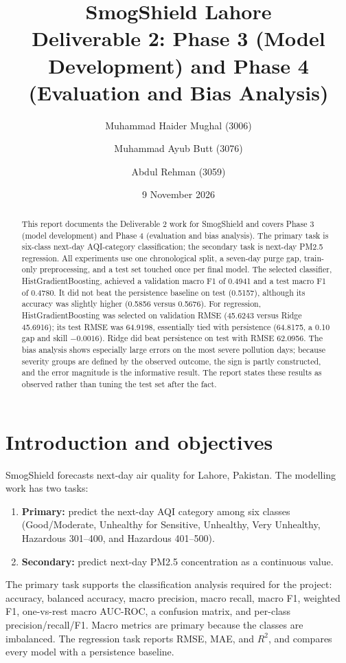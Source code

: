 \documentclass[11pt]{article}
\title{\textbf{SmogShield Lahore}\\[2mm]
Deliverable 2: Phase 3 (Model Development) and Phase 4 (Evaluation and Bias Analysis)}
\author{Muhammad Haider Mughal (3006) \and Muhammad Ayub Butt (3076) \and Abdul Rehman (3059)}
\date{9 November 2026}
\begin{document}
\maketitle

\begin{abstract}
This report documents the Deliverable 2 work for SmogShield and covers Phase 3 (model development) and Phase 4 (evaluation and bias analysis). The primary task is six-class next-day AQI-category classification; the secondary task is next-day PM2.5 regression. All experiments use one chronological split, a seven-day purge gap, train-only preprocessing, and a test set touched once per final model. The selected classifier, HistGradientBoosting, achieved a validation macro F1 of 0.4941 and a test macro F1 of 0.4780. It did not beat the persistence baseline on test (0.5157), although its accuracy was slightly higher (0.5856 versus 0.5676). For regression, HistGradientBoosting was selected on validation RMSE (45.6243 versus Ridge 45.6916); its test RMSE was 64.9198, essentially tied with persistence (64.8175, a 0.10 gap and skill $-0.0016$). Ridge did beat persistence on test with RMSE 62.0956. The bias analysis shows especially large errors on the most severe pollution days; because severity groups are defined by the observed outcome, the sign is partly constructed, and the error magnitude is the informative result. The report states these results as observed rather than tuning the test set after the fact.
\end{abstract}

\tableofcontents

\section{Introduction and objectives}

SmogShield forecasts next-day air quality for Lahore, Pakistan. The modelling work has two tasks:

\begin{enumerate}[leftmargin=1.4em]
  \item \textbf{Primary:} predict the next-day AQI category among six classes (Good/Moderate, Unhealthy for Sensitive, Unhealthy, Very Unhealthy, Hazardous 301--400, and Hazardous 401--500).
  \item \textbf{Secondary:} predict next-day PM2.5 concentration as a continuous value.
\end{enumerate}

The primary task supports the classification analysis required for the project: accuracy, balanced accuracy, macro precision, macro recall, macro F1, weighted F1, one-vs-rest macro AUC-ROC, a confusion matrix, and per-class precision/recall/F1. Macro metrics are primary because the classes are imbalanced. The regression task reports RMSE, MAE, and $R^2$, and compares every model with a persistence baseline.
\end{document}
